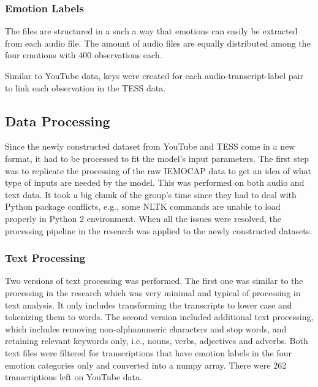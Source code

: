 \documentclass{article}
\newenvironment{subs}
  {\adjustwidth{3em}{0pt}}
  {\endadjustwidth}
\begin{document}
\begin{subs}
\subsubsection*{Emotion Labels}
The files are structured in a such a way that emotions can easily be extracted from each audio file. The amount of audio files are equally distributed among the four emotions with 400 observations each.

Similar to YouTube data, keys were created for each audio-transcript-label pair to link each observation in the TESS data.
\end{subs}

\begin{subs}
\subsection{Data Processing}
Since the newly constructed dataset from YouTube and TESS come in a new format, it had to be processed to fit the model’s input parameters. The first step was to replicate the processing of the raw IEMOCAP data to get an idea of what type of inputs are needed by the model. This was performed on both audio and text data. It took a big chunk of the group's time since they had to deal with Python package conflicts, e.g., some NLTK commands are unable to load properly in Python 2 environment. When all the issues were resolved, the processing pipeline in the research was applied to the newly constructed datasets.
\end{subs}

\begin{subs}
\subsubsection*{Text Processing}
Two versions of text processing was performed. The first one was similar to the processing in the research which was very minimal and typical of processing in text analysis. It only includes transforming the transcripts to lower case and tokenizing them to words. The second version included additional text processing, which includes removing non-alphanumeric characters and stop words, and retaining relevant keywords only, i.e., nouns, verbs, adjectives and adverbs. Both text files were filtered for transcriptions that have emotion labels in the four emotion categories only and converted into a numpy array. There were 262 transcriptions left on YouTube data.
\end{subs}
\end{document}
